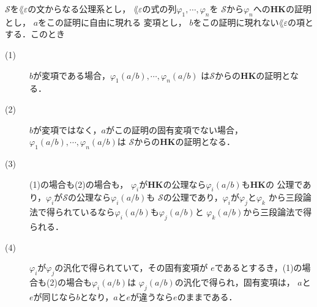 	\begin{screen}
		\begin{metathm}[証明に現れる変項に代入しても証明]
		\label{metathm:substitute_HK_proof}
			$\mathscr{S}$を$\lang{\varepsilon}$の文からなる公理系とし，
			$\lang{\varepsilon}$の式の列$\varphi_{1},\cdots,\varphi_{n}$を
			$\mathscr{S}$から$\varphi_{n}$への{\bf HK}の証明とし，
			$a$をこの証明に自由に現れる\footnotemark
			変項とし，
			$b$をこの証明に現れない$\lang{\varepsilon}$の項とする．このとき
			\begin{description}
				\item[(1)] $b$が変項である場合，$\varphi_{1}(a/b),\cdots,\varphi_{n}(a/b)$
					は$\mathscr{S}$からの{\bf HK}の証明となる．
					
				\item[(2)] $b$が変項ではなく\footnotemark，$a$がこの証明の固有変項でない場合，
					$\varphi_{1}(a/b),\cdots,\varphi_{n}(a/b)$は
					$\mathscr{S}$からの{\bf HK}の証明となる．
					
				\item[(3)] (1)の場合も(2)の場合も，
					$\varphi_{i}$が{\bf HK}の公理なら$\varphi_{i}(a/b)$も{\bf HK}の
					公理であり，$\varphi_{i}$が$\mathscr{S}$の公理なら$\varphi_{i}(a/b)$も
					$\mathscr{S}$の公理であり，$\varphi_{i}$が$\varphi_{j}$と$\varphi_{k}$
					から三段論法で得られているなら$\varphi_{i}(a/b)$も$\varphi_{j}(a/b)$と
					$\varphi_{k}(a/b)$から三段論法で得られる．
					
				\item[(4)] $\varphi_{i}$が$\varphi_{j}$の汎化で得られていて，その固有変項が
					$e$であるとするき，(1)の場合も(2)の場合も$\varphi_{i}(a/b)$は
					$\varphi_{j}(a/b)$の汎化で得られ，固有変項は，
					$a$と$e$が同じなら$b$となり，$a$と$e$が違うなら$e$のままである．
			\end{description}
		\end{metathm}
	\end{screen}
	
	
